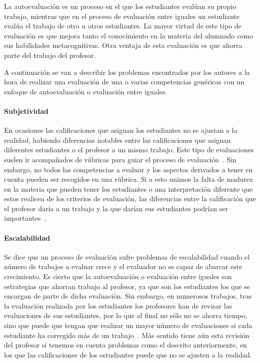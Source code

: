 La autoevaluación es un proceso en el que los estudiantes evalúan su propio trabajo, mientras que  en el proceso de evaluación entre iguales un estudiante evalúa el trabajo de otro u otros estudiantes. La mayor virtud de este tipo de evaluación es que mejora tanto el conocimiento en la materia del alumnado como sus habilidades metacognitivas. Otra ventaja de esta evaluación es que ahorra parte del trabajo del profesor.

A continuación se van a describir los problemas encontrados por los autores a la hora de realizar una evaluación de una o varias competencias genéricas con un enfoque de autoevaluación o evaluación entre iguales.

\paragraph*{Subjetividad}
En ocasiones las calificaciones que asignan los estudiantes no se ajustan a la realidad, habiendo diferencias notables entre las calificaciones que asignan diferentes estudiantes o el profesor a un mismo trabajo. Este tipo de evaluaciones suelen ir acompañados de rúbricas para guiar el proceso de evaluación~\cite{malehorn1994ten}. Sin embargo, no todos las competencias a evaluar y los aspectos derivados a tener en cuenta pueden ser recogidos en una rúbrica. Si a esto unimos la falta de madurez en la materia que pueden tener los estudiantes o una interpretación diferente que estos realicen de los criterios de evaluación, las diferencias entre la calificación que el profesor daría a un trabajo y la que darían sus estudiantes podrían ser importantes~\cite{carreras2013promotion}. %

\paragraph*{Escalabilidad}
Se dice que un proceso de evaluación sufre problemas de escalabilidad cuando el número de trabajos a evaluar crece y el evaluador no es capaz de abarcar este crecimiento. Es cierto que la autoevaluación o evaluación entre iguales son estrategias que ahorran trabajo al profesor, ya que son los estudiantes los que se encargan de parte de dicha evaluación. Sin embargo, en numerosos trabajos, tras la evaluación realizada por los estudiantes los profesores han de revisar las evaluaciones de sus estudiantes, por lo que al final no sólo no se ahorra tiempo, sino que puede que tengan que realizar un mayor número de evaluaciones si cada estudiante ha corregido más de un trabajo~\cite{lasa2013problem,sevilla2012assessment}. Más sentido tiene aún esta revisión del profesor si tenemos en cuenta problemas como el descrito anteriormente, en los que las calificaciones de los estudiantes puede que no se ajusten a la realidad.

